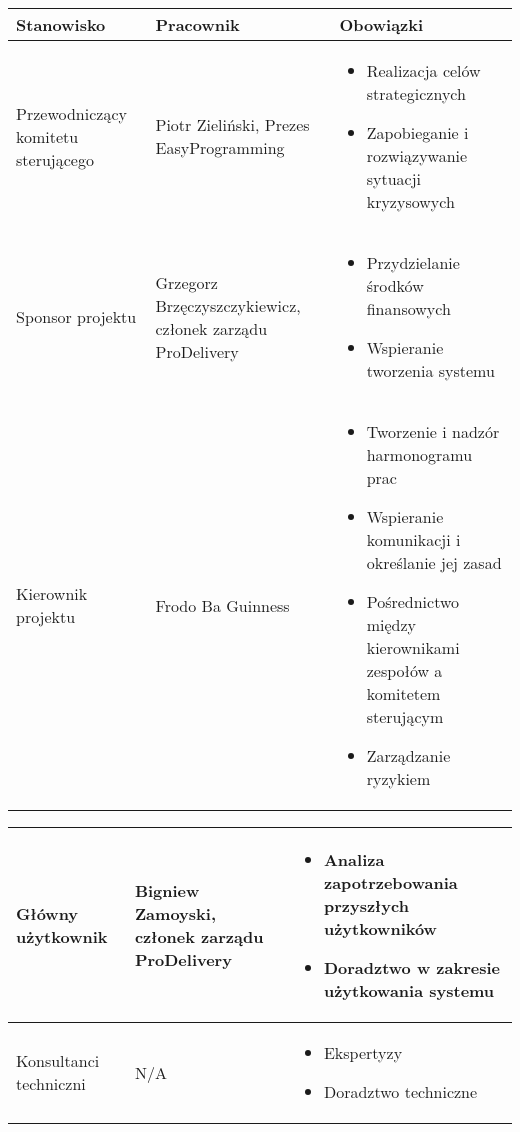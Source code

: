 \documentclass[12pt]{article}
\begin{document}
\begin{tabular}{|p{4.5cm}|p{4.5cm}|p{6.5cm}|} \hline
Stanowisko & Pracownik & Obowiązki \\
\hline \hline
Przewodniczący komitetu sterującego & Piotr Zieliński, Prezes EasyProgramming & 
\begin{itemize}
\item Realizacja celów strategicznych
\item Zapobieganie i rozwiązywanie sytuacji kryzysowych
\end{itemize}\\
\hline
Sponsor projektu & Grzegorz Brzęczyszczykiewicz, członek zarządu ProDelivery &
\begin{itemize}
\item Przydzielanie środków finansowych
\item Wspieranie tworzenia systemu
\end{itemize}\\
\hline
Kierownik projektu & Frodo Ba Guinness& 
\begin{itemize}
\item Tworzenie i nadzór harmonogramu prac
\item Wspieranie komunikacji i określanie jej zasad 
\item Pośrednictwo między kierownikami zespołów a komitetem sterującym
\item Zarządzanie ryzykiem
\end{itemize}\\
 \hline
\end{tabular}

\begin{tabular}{|p{4.5cm}|p{4.5cm}|p{6.5cm}|} \hline
Główny użytkownik & Bigniew Zamoyski, członek zarządu ProDelivery & 
\begin{itemize}
\item Analiza zapotrzebowania przyszłych użytkowników
\item Doradztwo w zakresie użytkowania systemu
\end{itemize}\\
 \hline
Konsultanci techniczni & N/A & 
\begin{itemize}
\item Ekspertyzy
\item Doradztwo techniczne
\end{itemize}\\
 \hline
\end{tabular}
\end{document}

